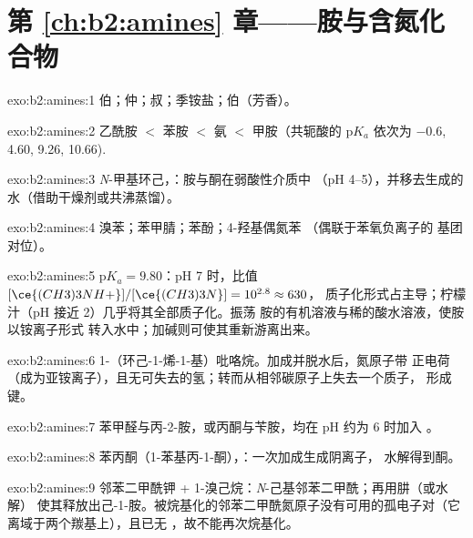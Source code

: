 \section*{第 \ref{ch:b2:amines} 章——胺与含氮化合物}

\begin{solution}{exo:b2:amines:1}
伯；仲；叔；季铵盐；伯（芳香）。
\end{solution}

\begin{solution}{exo:b2:amines:2}
乙酰胺 $<$ 苯胺 $<$ 氨 $<$ 甲胺（共轭酸的 $\mathrm pK_a$ 依次为
$-0.6$, 4.60, 9.26, 10.66).
\end{solution}

\begin{solution}{exo:b2:amines:3}
\textit{N}-甲基环己，：胺与酮在弱酸性介质中
（pH 4--5），并移去生成的水（借助干燥剂或共沸蒸馏）。
\end{solution}

\begin{solution}{exo:b2:amines:4}
溴苯；苯甲腈；苯酚；4-羟基偶氮苯 （偶联于苯氧负离子的
 基团对位）。
\end{solution}

\begin{solution}{exo:b2:amines:5}
$\mathrm pK_a = 9.80$：pH 7 时，比值 $[\ce{(CH3)3NH+}]/[\ce{(CH3)3N}] = 10^{2.8} \approx 630$，
质子化形式占主导；柠檬汁（pH 接近 2）几乎将其全部质子化。振荡
胺的有机溶液与稀的酸水溶液，使胺以铵离子形式
转入水中；加碱则可使其重新游离出来。
\end{solution}

\begin{solution}{exo:b2:amines:6}
1-（环己-1-烯-1-基）吡咯烷。加成并脱水后，氮原子带
正电荷（成为亚铵离子），且无可失去的氢；转而从相邻碳原子上失去一个质子，
形成  键。
\end{solution}

\begin{solution}{exo:b2:amines:7}
苯甲醛与丙-2-胺，或丙酮与苄胺，均在
pH 约为 6 时加入 。
\end{solution}

\begin{solution}{exo:b2:amines:8}
苯丙酮（1-苯基丙-1-酮），：一次加成生成阴离子，
水解得到酮。
\end{solution}

\begin{solution}{exo:b2:amines:9}
邻苯二甲酰钾 + 1-溴己烷：\textit{N}-己基邻苯二甲酰；再用肼（或水解）
使其释放出己-1-胺。被烷基化的邻苯二甲酰氮原子没有可用的孤电子对（它
离域于两个羰基上），且已无 ，故不能再次烷基化。
\end{solution}

